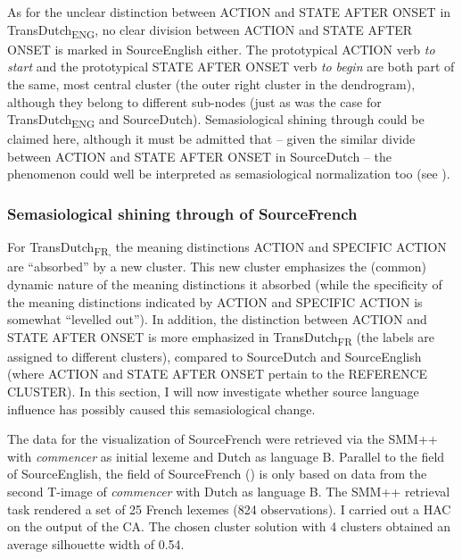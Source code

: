 As for the unclear distinction between ACTION and STATE AFTER ONSET in TransDutch\textsubscript{ENG}, no clear division between ACTION and STATE AFTER ONSET is marked in SourceEnglish either. The prototypical ACTION verb \textit{to} \textit{start} and the prototypical STATE AFTER ONSET verb \textit{to} \textit{begin} are both part of the same, most central cluster (the outer right cluster in the dendrogram), although they belong to different sub-nodes (just as was the case for TransDutch\textsubscript{ENG} and SourceDutch). Semasiological shining through could be claimed here, although it must be admitted that -- given the similar divide between ACTION and STATE AFTER ONSET in SourceDutch – the phenomenon could well be interpreted as semasiological normalization too (see ).

\subsubsection{Semasiological shining through of SourceFrench}
\label{sec:4.6.1.2}  
For TransDutch\textsubscript{FR,} the meaning distinctions ACTION and {SPECIFIC} ACTION are ``absorbed'' by a new cluster. This new cluster emphasizes the (common) dynamic nature of the meaning distinctions it absorbed (while the specificity of the meaning distinctions indicated by ACTION and {SPECIFIC} ACTION is somewhat ``levelled out''). In addition, the distinction between ACTION and STATE AFTER ONSET is more emphasized in TransDutch\textsubscript{FR} (the labels are assigned to different clusters), compared to SourceDutch and SourceEnglish (where ACTION and STATE AFTER ONSET pertain to the REFERENCE CLUSTER). In this section, I will now investigate whether source language influence has possibly caused this semasiological change.

The data for the visualization of SourceFrench were retrieved via the SMM++ with \textit{commencer} as initial lexeme and Dutch as language B. Parallel to the field of SourceEnglish, the field of SourceFrench () is only based on data from the second T-image of \textit{commencer} with Dutch as language B. The SMM++ retrieval task rendered a set of 25 French lexemes (824 observations). I carried out a HAC on the output of the CA. The chosen cluster solution with 4 clusters obtained an average silhouette width of 0.54.

